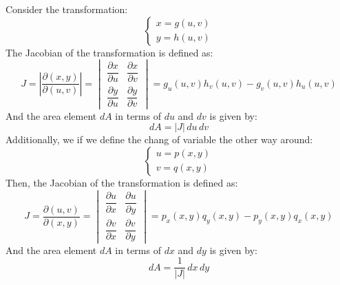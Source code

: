 \documentclass[11pt]{report}
\begin{document}
\begin{definition}
    Consider the transformation:
    $$
    \begin{cases}
        x = g(u,v) \\
        y = h(u,v)
    \end{cases}
    $$
    The Jacobian of the transformation is defined as:
    \begin{equation}
        J = \left| \frac{\partial(x,y)}{\partial(u,v)} \right|= \begin{vmatrix}
            \dfrac{\partial x}{\partial u} & \dfrac{\partial x}{\partial v} \\
            \dfrac{\partial y}{\partial u} & \dfrac{\partial y}{\partial v}
        \end{vmatrix} = g_u(u,v) h_v(u,v) - g_v(u,v) h_u(u,v)
        \end{equation}
    And the area element $dA$ in terms of $du$ and $dv$ is given by:
    $$
        dA = |J| \, du \, dv
    $$
    Additionally, we if we define the chang of variable the other way around:
    $$
    \begin{cases}
        u = p(x,y) \\
        v = q(x,y)
    \end{cases}
    $$
    Then, the Jacobian of the transformation is defined as:
    $$
        J = \frac{\partial(u,v)}{\partial(x,y)} = \begin{vmatrix}
            \dfrac{\partial u}{\partial x} & \dfrac{\partial u}{\partial y} \\
            \dfrac{\partial v}{\partial x} & \dfrac{\partial v}{\partial y}
        \end{vmatrix} = p_x(x,y) q_y(x,y) - p_y(x,y) q_x(x,y)
    $$
    And the area element $dA$ in terms of $dx$ and $dy$ is given by:
    $$        
        dA = \frac{1}{|J|} \, dx \, dy
    $$
    

\end{definition}
\end{document}
